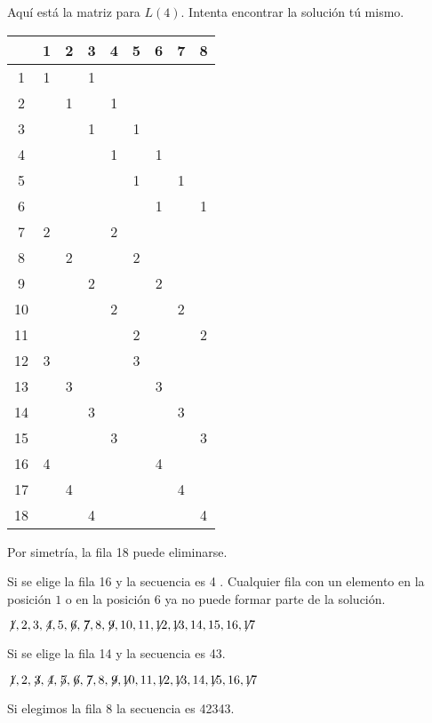 Aquí está la matriz para $L(4)$. Intenta encontrar la solución tú mismo.
\begin{center}
\addtolength{\tabcolsep}{4pt}
\begin{tabular}{|c||c|c|c|c|c|c|c|c|}
\hline
&1&2&3&4&5&6&7&8\\\hline\hline
1&1&&1&&&&&\\\hline
2&&1&&1&&&&\\\hline
3&&&1&&1&&&\\\hline
4&&&&1&&1&&\\\hline
5&&&&&1&&1&\\\hline
6&&&&&&1&&1\\\hline
7&2&&&2&&&&\\\hline
8&&2&&&2&&&\\\hline
9&&&2&&&2&&\\\hline
10&&&&2&&&2&\\\hline
11&&&&&2&&&2\\\hline
12&3&&&&3&&&\\\hline
13&&3&&&&3&&\\\hline
14&&&3&&&&3&\\\hline
15&&&&3&&&&3\\\hline
16&4&&&&&4&&\\\hline
17&&4&&&&&4&\\\hline
18&&&4&&&&&4\\\hline
\end{tabular}
\end{center}
Por simetría, la fila 18 puede eliminarse.

\smallskip

\noindent Si se elige la fila 16 y la secuencia es 4\textvisiblespace\textvisiblespace\textvisiblespace{} \textvisiblespace\textvisiblespace.
Cualquier fila con un elemento en la posición $1$ o en la posición $6$ ya no puede formar parte de la solución.

$\not\! 1,2,3,\not\! 4,5,\not\! 6,\not\! 7,8,\not\! 9,10,11,\not\!\! 12,\not\!\! 13,14,15,16,\not\!\! 17$

\noindent Si se elige  la fila 14 y la secuencia es 4\textvisiblespace{}3\textvisiblespace.

$\not\! 1,2,\not\! 3,\not\! 4,\not\! 5,\not\! 6,\not\! 7,8,\not\! 9,\not\!\! 10,11,\not\!\! 12,\not\!\! 13,14, \not\!\! 15,16,\not\!\! 17$

\noindent Si elegimos la fila 8 la secuencia es 4{}2{}34{}3\textvisiblespace.

